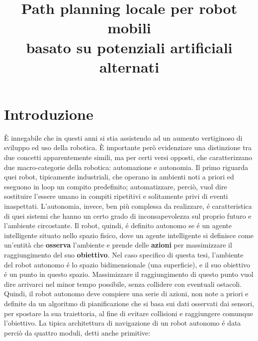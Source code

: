 \documentclass[14pt,twoside,a4paper]{extarticle}
\title{Path planning locale per robot mobili \\ basato su potenziali artificiali alternati}
\author{}
\date{}
\begin{document}
\maketitle \newpage %
\tableofcontents \newpage %

\section{Introduzione}
È innegabile che in questi anni si stia assistendo ad un aumento vertiginoso di sviluppo ed uso della robotica. È importante però evidenziare una distinzione tra due concetti apparentemente simili, ma per certi versi opposti, che caratterizzano due macro-categorie della robotica: automazione e autonomia. Il primo riguarda quei robot, tipicamente industriali, che operano in ambienti noti a priori ed eseguono in loop un compito predefinito; automatizzare, perciò, vuol dire sostituire l'essere umano in compiti ripetitivi e solitamente privi di eventi inaspettati. L'autonomia, invece, ben più complessa da realizzare, é caratteristica di quei sistemi che hanno un certo grado di inconsapevolezza sul proprio futuro e l'ambiente circostante.  Il robot, quindi, é definito autonomo se é un agente intelligente situato nello spazio fisico, dove un agente intelligente si definisce come un'entità che \textbf{osserva} l'ambiente e prende delle \textbf{azioni} per massimizzare il raggiungimento del suo \textbf{obiettivo}\cite{murphy}. Nel caso specifico di questa tesi, l'ambiente del robot autonomo é lo spazio bidimensionale (una superficie), e il suo obiettivo é un punto in questo spazio. Massimizzare il raggiungimento di questo punto vuol dire arrivarci nel minor tempo possibile, senza collidere con eventuali ostacoli. Quindi, il robot autonomo deve compiere una serie di azioni, non note a priori e definite da un algoritmo di pianificazione che si basa sui dati osservati dai sensori, per spostare la sua traiettoria, al fine di evitare collisioni e raggiungere comunque l'obiettivo. La tipica architettura di navigazione di un robot autonomo é data perciò da quattro moduli, detti anche primitive: 
\end{document}
